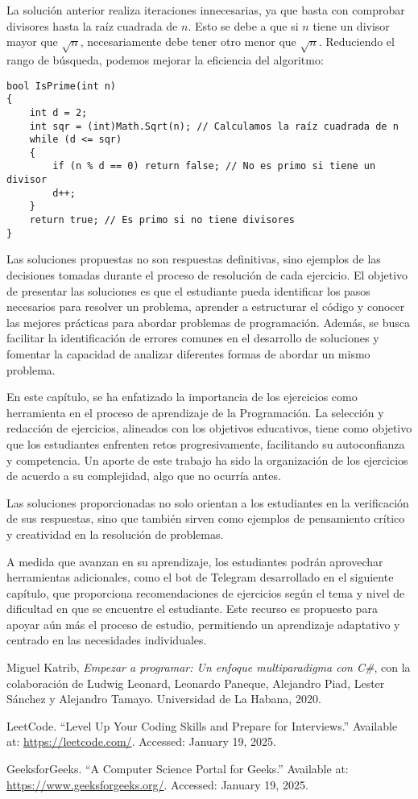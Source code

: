 \documentclass{article}
\begin{document}
La solución anterior realiza iteraciones innecesarias, ya que basta con comprobar divisores hasta la raíz cuadrada de \(n\). Esto se debe a que si \(n\) tiene un divisor mayor que \(\sqrt{n}\), necesariamente debe tener otro menor que \(\sqrt{n}\). Reduciendo el rango de búsqueda, podemos mejorar la eficiencia del algoritmo:

\begin{lstlisting}
bool IsPrime(int n)
{
    int d = 2;
    int sqr = (int)Math.Sqrt(n); // Calculamos la raíz cuadrada de n
    while (d <= sqr)
    {
        if (n % d == 0) return false; // No es primo si tiene un divisor
        d++;
    }
    return true; // Es primo si no tiene divisores
}
\end{lstlisting}

Las soluciones propuestas no son respuestas definitivas, sino ejemplos de las decisiones tomadas durante el proceso de resolución de cada ejercicio. El objetivo de presentar las soluciones es que el estudiante pueda identificar los pasos necesarios para resolver un problema, aprender a estructurar el código y conocer las mejores prácticas para abordar problemas de programación. Además, se busca facilitar la identificación de errores comunes en el desarrollo de soluciones y fomentar la capacidad de analizar diferentes formas de abordar un mismo problema.

En este capítulo, se ha enfatizado la importancia de los ejercicios como herramienta en el proceso de aprendizaje de la Programación. La selección y redacción de ejercicios, alineados con los objetivos educativos, tiene como objetivo que los estudiantes enfrenten retos progresivamente, facilitando su autoconfianza y competencia. Un aporte de este trabajo ha sido la organización de los ejercicios de acuerdo a su complejidad, algo que no ocurría antes.

Las soluciones proporcionadas no solo orientan a los estudiantes en la verificación de sus respuestas, sino que también sirven como ejemplos de pensamiento crítico y creatividad en la resolución de problemas.

A medida que avanzan en su aprendizaje, los estudiantes podrán aprovechar herramientas adicionales, como el bot de Telegram desarrollado en el siguiente capítulo, que proporciona recomendaciones de ejercicios según el tema y nivel de dificultad en que se encuentre el estudiante. Este recurso es propuesto para apoyar aún más el proceso de estudio, permitiendo un aprendizaje adaptativo y centrado en las necesidades individuales.

\begin{thebibliography}{99}
Miguel Katrib, \textit{Empezar a programar: Un enfoque multiparadigma con C\#}, con la colaboración de Ludwig Leonard, Leonardo Paneque, Alejandro Piad, Lester Sánchez y Alejandro Tamayo. Universidad de La Habana, 2020.

LeetCode. ``Level Up Your Coding Skills and Prepare for Interviews.'' Available at: \url{https://leetcode.com/}. Accessed: January 19, 2025.

GeeksforGeeks. ``A Computer Science Portal for Geeks.'' Available at: \url{https://www.geeksforgeeks.org/}. Accessed: January 19, 2025.
\end{thebibliography}
\end{document}
